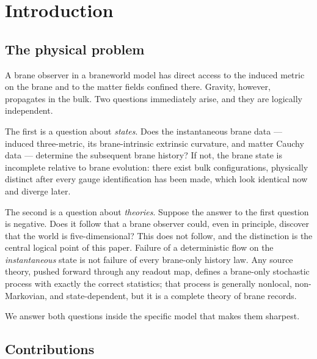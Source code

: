 \documentclass[11pt,a4paper]{article}
\theoremstyle{plain}
\theoremstyle{definition}
\begin{document}
\tableofcontents

\section{Introduction}
\label{sec:intro}

\subsection{The physical problem}

A brane observer in a braneworld model has direct access to the induced
metric on the brane and to the matter fields confined there. Gravity,
however, propagates in the bulk. Two questions immediately arise, and
they are logically independent.

The first is a question about \emph{states}. Does the instantaneous
brane data --- induced three-metric, its brane-intrinsic extrinsic
curvature, and matter Cauchy data --- determine the subsequent brane
history? If not, the brane state is incomplete relative to brane
evolution: there exist bulk configurations, physically distinct after
every gauge identification has been made, which look identical now and
diverge later.

The second is a question about \emph{theories}. Suppose the answer to
the first question is negative. Does it follow that a brane observer
could, even in principle, discover that the world is five-dimensional?
This does not follow, and the distinction is the central logical point
of this paper. Failure of a deterministic flow on the \emph{instantaneous}
state is not failure of every brane-only history law. Any source theory,
pushed forward through any readout map, defines a brane-only stochastic
process with exactly the correct statistics; that process is generally
nonlocal, non-Markovian, and state-dependent, but it is a complete
theory of brane records.

We answer both questions inside the specific model that makes them
sharpest.

\subsection{Contributions}
\end{document}
